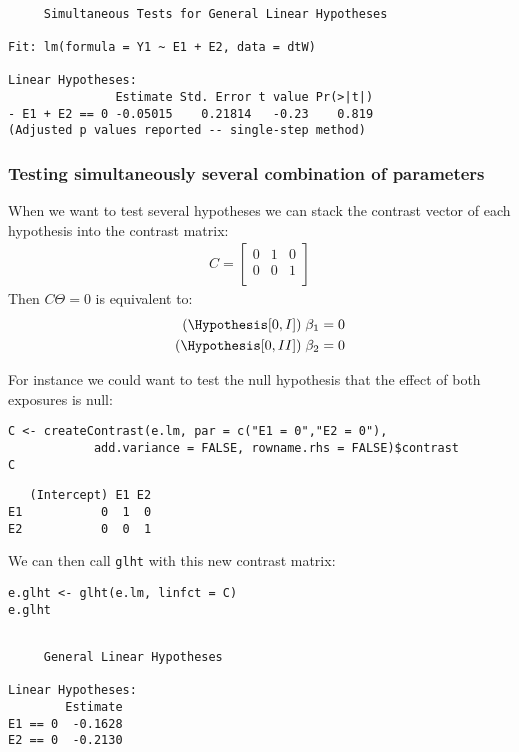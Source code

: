 \documentclass{article}
\begin{document}
\begin{verbatim}

	 Simultaneous Tests for General Linear Hypotheses

Fit: lm(formula = Y1 ~ E1 + E2, data = dtW)

Linear Hypotheses:
               Estimate Std. Error t value Pr(>|t|)
- E1 + E2 == 0 -0.05015    0.21814   -0.23    0.819
(Adjusted p values reported -- single-step method)
\end{verbatim}

\subsubsection{Testing simultaneously several combination of parameters}
\label{sec:introMultComp}
When we want to test several hypotheses we can stack the contrast
vector of each hypothesis into the contrast matrix:
\begin{align*}
C = \begin{bmatrix}
0 & 1 & 0 \\
0 & 0 & 1 \\
\end{bmatrix}
\end{align*}
Then \(C \Theta = 0\) is equivalent to:
\begin{align*}
(\Hypothesis[0,I]) \; \beta_1 = 0 \\
(\Hypothesis[0,II]) \; \beta_2 = 0
\end{align*}

For instance we could want to test the null hypothesis that the effect
of both exposures is null:
\lstset{language=r,label= ,caption= ,captionpos=b,numbers=none}
\begin{lstlisting}
C <- createContrast(e.lm, par = c("E1 = 0","E2 = 0"),
		    add.variance = FALSE, rowname.rhs = FALSE)$contrast
C
\end{lstlisting}

\begin{verbatim}
   (Intercept) E1 E2
E1           0  1  0
E2           0  0  1
\end{verbatim}

We can then call \texttt{glht} with this new contrast matrix:
\lstset{language=r,label= ,caption= ,captionpos=b,numbers=none}
\begin{lstlisting}
e.glht <- glht(e.lm, linfct = C)
e.glht
\end{lstlisting}

\begin{verbatim}

	 General Linear Hypotheses

Linear Hypotheses:
        Estimate
E1 == 0  -0.1628
E2 == 0  -0.2130
\end{verbatim}
\end{document}
